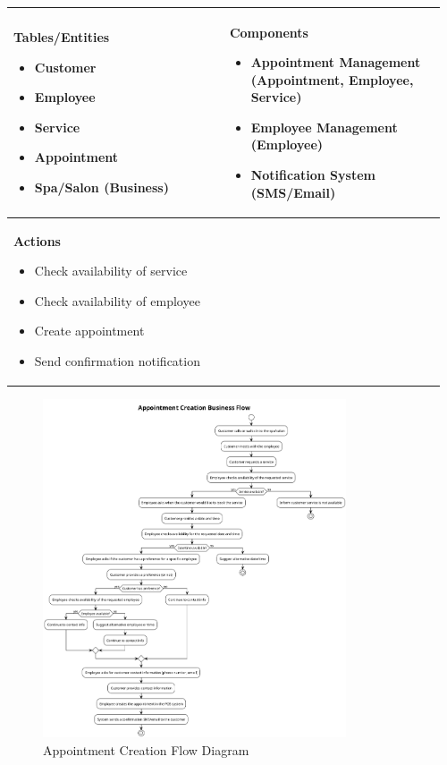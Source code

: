 \documentclass[]{VUMIFTemplateClass}
\newenvironment{mpitemlist}[1][\linewidth]{%
    \begin{minipage}[t]{#1}%
        \setlength{\leftmargini}{12pt}%
        \begin{itemize}%
            \setlength{\itemsep}{1pt}%
            \setlength{\parskip}{0pt}%
            \setlength{\parsep}{0pt}%
}{%
        \end{itemize}%
    \end{minipage}\newline
}
\begin{document}
\begin{center}
\setlength{\tabcolsep}{8pt}
\begin{tabular}{|p{0.48\linewidth}|p{0.48\linewidth}|}
\hline
\textbf{Tables/Entities} \newline
\begin{mpitemlist}
\item Customer
\item Employee
\item Service
\item Appointment
\item Spa/Salon (Business)
\end{mpitemlist}
&
\textbf{Components} \newline
\begin{mpitemlist}
\item Appointment Management (Appointment, Employee, Service)
\item Employee Management (Employee)
\item Notification System (SMS/Email)
\end{mpitemlist}
\\ \hline
\textbf{Actions} \newline
\begin{mpitemlist}
\item Check availability of service
\item Check availability of employee
\item Create appointment
\item Send confirmation notification
\end{mpitemlist}
&

\\ \hline
\end{tabular}
\end{center}

\begin{figure}[H]
    \centering
    \includegraphics[width=0.8\textwidth]{images/diagrams/services/appointment_creation_flow.png}
    \caption{Appointment Creation Flow Diagram}
    \label{fig:appointment_creation_flow}
\end{figure}
\end{document}
